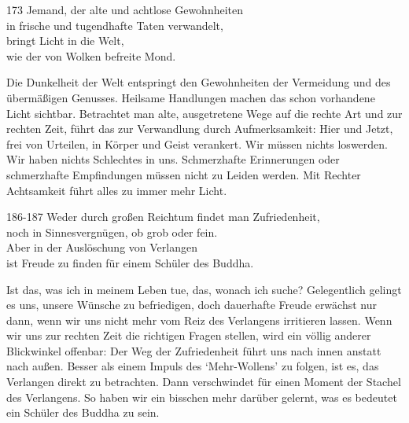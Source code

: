 
\begin{dhpVerse}{173}
\label{dhp-173}
Jemand, der alte und achtlose Gewohnheiten\\ 
in frische und tugendhafte Taten verwandelt,\\ 
bringt Licht in die Welt,\\ 
wie der von Wolken befreite Mond. 
\end{dhpVerse}

\begin{dhpRefl}

Die Dunkelheit der Welt entspringt den Gewohnheiten der Vermeidung und des
übermäßigen Genusses. Heilsame Handlungen machen das schon vorhandene Licht
sichtbar. Betrachtet man alte, ausgetretene Wege auf die rechte Art und zur
rechten Zeit, führt das zur Verwandlung durch Aufmerksamkeit: Hier und Jetzt,
frei von Urteilen, in Körper und Geist verankert. Wir müssen nichts loswerden.
Wir haben nichts Schlechtes in uns. Schmerzhafte Erinnerungen oder
schmerzhafte Empfindungen müssen nicht zu Leiden werden. Mit Rechter
Achtsamkeit führt alles zu immer mehr Licht.

\end{dhpRefl}


\begin{dhpVerse}{186-187}
\label{dhp-186}\label{dhp-187}
Weder durch großen Reichtum findet man Zufriedenheit,\\ 
noch in Sinnesvergnügen, ob grob oder fein.\\ 
Aber in der Auslöschung von Verlangen\\ 
ist Freude zu finden für einem Schüler des Buddha. 
\end{dhpVerse}

\begin{dhpRefl}

Ist das, was ich in meinem Leben tue, das, wonach ich suche? Gelegentlich
gelingt es uns, unsere Wünsche zu befriedigen, doch dauerhafte Freude erwächst
nur dann, wenn wir uns nicht mehr vom Reiz des Verlangens irritieren lassen.
Wenn wir uns zur rechten Zeit die richtigen Fragen stellen, wird ein völlig
anderer Blickwinkel offenbar: Der Weg der Zufriedenheit führt uns nach innen
anstatt nach außen. Besser als einem Impuls des `Mehr-Wollens' zu folgen, ist
es, das Verlangen direkt zu betrachten. Dann verschwindet für einen Moment der
Stachel des Verlangens. So haben wir ein bisschen mehr darüber gelernt, was es
bedeutet ein Schüler des Buddha zu sein.

\end{dhpRefl}

